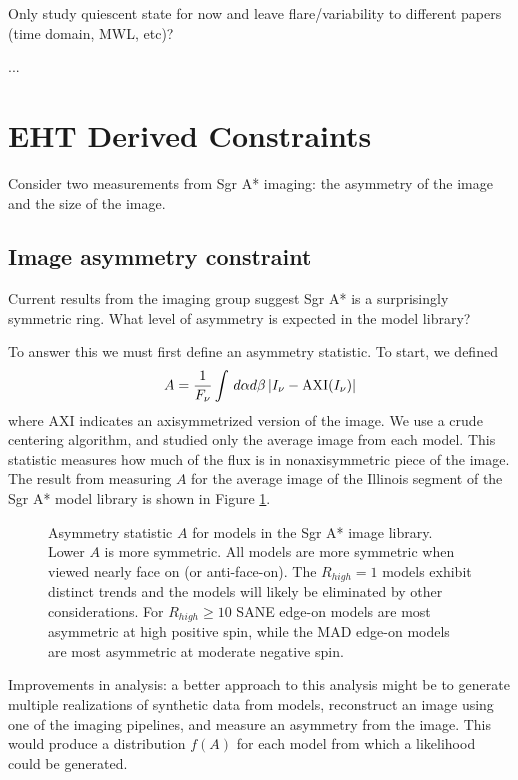 \documentclass[twocolumn,tighten,dvipsnames]{aastex63}
\newcommand\<{{\langle}}
\renewcommand\>{{\rangle}} %
\begin{document}
Only study quiescent state for now and leave flare/variability to different papers (time domain, MWL, etc)?

...

\section{EHT Derived Constraints}

Consider two measurements from Sgr A* imaging: the asymmetry of the image and the size of the image.

\subsection{Image asymmetry constraint}

Current results from the imaging group suggest Sgr A* is a surprisingly symmetric ring.   What level of asymmetry is expected in the model library?

To answer this we must first define an asymmetry statistic.  To start, we defined
\begin{equation}
    A = \frac{1}{F_\nu} \int \, d\alpha d\beta \, | I_\nu - {\rm AXI}(I_\nu) |
\end{equation}
where AXI indicates an axisymmetrized version of the image.  We use a crude centering algorithm, and studied only the average image from each model.  This statistic measures how much of the flux is in nonaxisymmetric piece of the image.   The result from measuring $A$ for the average image of the Illinois segment of the Sgr A* model library is shown in Figure \ref{fig:asymm}.

\begin{figure}\label{fig:asymm}
    \caption{Asymmetry statistic $A$ for models in the Sgr A* image library.  Lower $A$ is more symmetric.  All models are more symmetric when viewed nearly face on (or anti-face-on).  The $R_{high} = 1$ models exhibit distinct trends and the models will likely be eliminated by other considerations.  For $R_{high} \ge 10$ SANE edge-on models are most asymmetric at high positive spin, while the MAD edge-on models are most asymmetric at moderate negative spin.}
\end{figure}

Improvements in analysis: a better approach to this analysis might be to generate multiple realizations of synthetic data from models, reconstruct an image using one of the imaging pipelines, and measure an asymmetry from the image.  This would produce a distribution $f(A)$ for each model from which a likelihood could be generated.
\end{document}
